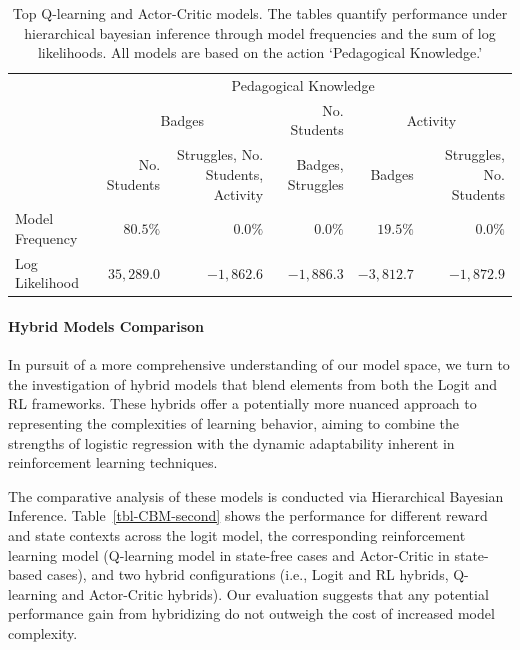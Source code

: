 \documentclass[
  number,
  preprint,
  3p,
  onecolumn]{elsarticle}
\let\oldparagraph\paragraph
\renewcommand{\paragraph}[1]{\oldparagraph{#1}\mbox{}}
\begin{document}
\begin{longtable}{l|rrrrr}

\caption{\label{tbl-CBM-HBI}Top Q-learning and Actor-Critic models. The
tables quantify performance under hierarchical bayesian inference
through model frequencies and the sum of log likelihoods. All models are
based on the action `Pedagogical Knowledge.'}

\tabularnewline

\toprule
\multicolumn{1}{l}{} & \multicolumn{5}{c}{Pedagogical Knowledge} \\ 
\cmidrule(lr){2-6}
\multicolumn{1}{l}{} & \multicolumn{2}{c}{Badges} & No. Students & \multicolumn{2}{c}{Activity} \\ 
\cmidrule(lr){2-3} \cmidrule(lr){4-4} \cmidrule(lr){5-6}
\multicolumn{1}{l}{} & No. Students & Struggles, No. Students, Activity & Badges, Struggles & Badges & Struggles, No. Students \\ 
\midrule\addlinespace[2.5pt]
Model Frequency & $80.5\%$ & $0.0\%$ & $0.0\%$ & $19.5\%$ & $0.0\%$ \\ 
\midrule\addlinespace[2.5pt]
Log Likelihood & $35,289.0$ & $-1,862.6$ & $-1,886.3$ & $-3,812.7$ & $-1,872.9$ \\ 
\bottomrule

\end{longtable}

\paragraph{Hybrid Models Comparison}\label{hybrid-models-comparison}

In pursuit of a more comprehensive understanding of our model space, we
turn to the investigation of hybrid models that blend elements from both
the Logit and RL frameworks. These hybrids offer a potentially more
nuanced approach to representing the complexities of learning behavior,
aiming to combine the strengths of logistic regression with the dynamic
adaptability inherent in reinforcement learning techniques.

The comparative analysis of these models is conducted via Hierarchical
Bayesian Inference. Table~\ref{tbl-CBM-second} shows the performance for
different reward and state contexts across the logit model, the
corresponding reinforcement learning model (Q-learning model in
state-free cases and Actor-Critic in state-based cases), and two hybrid
configurations (i.e., Logit and RL hybrids, Q-learning and Actor-Critic
hybrids). Our evaluation suggests that any potential performance gain
from hybridizing do not outweigh the cost of increased model complexity.
\end{document}
